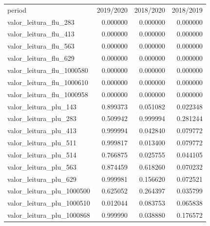 \begin{tabular}{lrrr}
period & 2019/2020 & 2018/2020 & 2018/2019 \\
valor_leitura_flu_283 & 0.000000 & 0.000000 & 0.000000 \\
valor_leitura_flu_413 & 0.000000 & 0.000000 & 0.000000 \\
valor_leitura_flu_563 & 0.000000 & 0.000000 & 0.000000 \\
valor_leitura_flu_629 & 0.000000 & 0.000000 & 0.000000 \\
valor_leitura_flu_1000580 & 0.000000 & 0.000000 & 0.000000 \\
valor_leitura_flu_1000610 & 0.000000 & 0.000000 & 0.000000 \\
valor_leitura_flu_1000958 & 0.000000 & 0.000000 & 0.000000 \\
valor_leitura_plu_143 & 0.899373 & 0.051082 & 0.022348 \\
valor_leitura_plu_283 & 0.509942 & 0.999994 & 0.281244 \\
valor_leitura_plu_413 & 0.999994 & 0.042840 & 0.079772 \\
valor_leitura_plu_511 & 0.999817 & 0.013400 & 0.079772 \\
valor_leitura_plu_514 & 0.766875 & 0.025755 & 0.044105 \\
valor_leitura_plu_563 & 0.874459 & 0.618260 & 0.070232 \\
valor_leitura_plu_629 & 0.999981 & 0.156620 & 0.072521 \\
valor_leitura_plu_1000500 & 0.625052 & 0.264397 & 0.035799 \\
valor_leitura_plu_1000510 & 0.012044 & 0.083753 & 0.065838 \\
valor_leitura_plu_1000868 & 0.999990 & 0.038880 & 0.176572 \\
\end{tabular}
